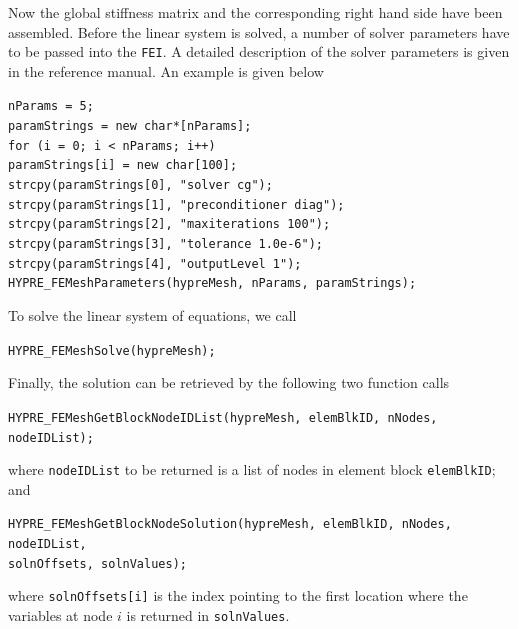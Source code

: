 Now the global stiffness matrix and the corresponding right hand side
have been assembled. Before the linear system is solved, a number of 
solver parameters have to be passed into the {\tt FEI}. A detailed description
of the solver parameters is given in the reference manual. An example is 
given below
\begin{tabbing}
\hspace{0.5in} \= {\tt nParams = 5;} \\
               \> {\tt paramStrings = new char*[nParams];} \\
               \> {\tt for (i = 0; i < nParams; i++) }\\
               \> \hspace{0.5in} {\tt paramStrings[i] = new char[100];} \\
               \> {\tt strcpy(paramStrings[0], "solver cg");} \\
               \> {\tt strcpy(paramStrings[1], "preconditioner diag");} \\
               \> {\tt strcpy(paramStrings[2], "maxiterations 100");} \\
               \> {\tt strcpy(paramStrings[3], "tolerance 1.0e-6");} \\
               \> {\tt strcpy(paramStrings[4], "outputLevel 1");} \\
 \> {\tt HYPRE\_FEMeshParameters(hypreMesh, nParams, paramStrings);} 
\end{tabbing}

To solve the linear system of equations, we call
\begin{tabbing}
\hspace{0.5in} \= {\tt HYPRE\_FEMeshSolve(hypreMesh);}
\end{tabbing}
Finally, the solution can be retrieved by the following two function calls
\begin{tabbing}
\hspace{0.5in} \= {\tt HYPRE\_FEMeshGetBlockNodeIDList(hypreMesh, elemBlkID, nNodes, nodeIDList);}
\end{tabbing}
where {\tt nodeIDList} to be returned is a list of nodes in element 
block {\tt elemBlkID}; and
\begin{tabbing}
\hspace{0.5in} \= {\tt HYPRE\_FEMeshGetBlockNodeSolution(hypreMesh, elemBlkID, nNodes, nodeIDList,}\\
\> \hspace{1.0in} {\tt solnOffsets, solnValues);}
\end{tabbing}
where {\tt solnOffsets[i]} is the index pointing to the first location 
where the variables at node $i$ is returned in {\tt solnValues}.

